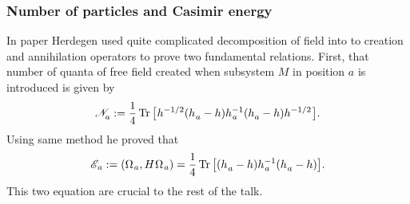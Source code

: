 \documentclass[10pt,t]{beamer}
\begin{document}
\begin{frame}
  \frametitle{Number of particles and Casimir energy}


  In paper \parencite{Herdegen-Quantum-backreaction-ETC-Part-I-Pub-2005}
  Herdegen used quite complicated decomposition of field into to creation
  and annihilation operators to prove two fundamental relations. First, that
  number of quanta of \alert{free} field created when subsystem $M$ in
  position $a$ is introduced is given by
  \begin{equation}
    \label{eq:Uklad-quasi-swobodny-w-obecnosci-ETC-21}
    \mathcal{N}_{ a }^{ \vphantom{1} } :=
    \frac{ 1 }{ 4 } \operatorname{Tr}\big[ \hspace{0.05em} h^{ -1/2 } (
    h_{ \hspace{0.05em} a }^{ \vphantom{1} } - h ) h_{ \hspace{0.05em} a }^{ -1 }
    ( h_{ a }^{ \vphantom{1} } - h ) h^{ -1/2 } \hspace{0.07em} \big].
  \end{equation}
  Using same method he proved that
  \begin{equation}
    \label{eq:Epstein-Glaser-24-A}
    \mathcal{E}_{ \hspace{0.07em} a } :=
    ( \Omega_{ \hspace{0.07em} a }, H \hspace{0.05em} \Omega_{ \hspace{0.07em} a } ) =
    \frac{ 1 }{ 4 }
    \operatorname{Tr}\big[ ( h_{ \hspace{0.05em} a }^{ \vphantom{1} } - h )
    h_{ \hspace{0.05em} a }^{ -1 }
    ( h_{ \hspace{0.05em} a }^{ \vphantom{1} } - h ) \big].
  \end{equation}
  This two equation are crucial to the rest of the talk.

\end{frame}
\end{document}
